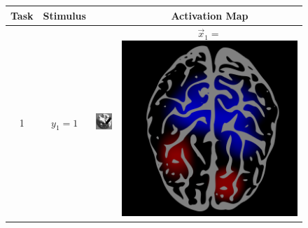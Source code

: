 \begin{figure}
\centering
\begin{tabular}{|c|cc|c|}
\hline
Task & Stimulus & & Activation Map\\ \hline
1 & $y_1 = 1$ & \includegraphics[scale = 0.26]{../../proposal/img3.png} & $\vec{x}_1 = $ \includegraphics[scale = 0.035]{../../proposal/brain1.png} \\ \hline

\end{tabular}
\end{figure}
